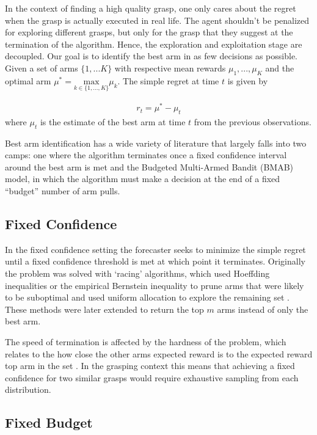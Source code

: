 \documentclass[journal,transmag]{IEEEtran}%
\begin{document}
In the context of finding a high quality grasp, one only cares about the regret when the grasp is actually executed in real life. The agent shouldn't be penalized for exploring different grasps, but only for the grasp that they suggest at the termination of the algorithm. Hence, the exploration and exploitation stage are decoupled. Our goal is to identify the best arm in as few decisions as possible.
Given a set of arms $\lbrace 1,...K \rbrace$ with respective mean rewards $\mu_1, ..., \mu_K$ and the optimal arm $\mu^* = \underset{k\in\lbrace 1, ..., K \rbrace}{\mbox{max}} \mu_k$.
The simple regret at time $t$ is given by

\vspace{-2ex}
\begin{align}\label{eq:simple_regret}
r_t = \mu^* - \mu_t
\end{align}
\noindent where $\mu_t$ is the estimate of the best arm at time $t$ from the previous observations. 

Best arm identification has a wide variety of literature that largely falls into two camps: one where the algorithm terminates once a fixed confidence interval around the best arm is met and the Budgeted Multi-Armed Bandit (BMAB) model, in which the algorithm must make a decision at the end of a fixed ``budget'' number of arm pulls.

\subsection{Fixed Confidence}
In the fixed confidence setting the forecaster seeks to minimize the simple regret until a fixed confidence threshold is met at which point it terminates. Originally the problem was solved with `racing' algorithms, which used Hoeffding inequalities or the empirical Bernstein inequality to prune arms that were likely to be suboptimal and used uniform allocation to explore the remaining set \cite{maron1993hoeffding} \cite{mnih2008empirical}. These methods were later extended to return the top $m$ arms instead of only the best arm\cite{gabillon2012best}. 

The speed of termination is affected by the hardness of the problem, which relates to the how close the other arms expected reward is to the expected reward top arm in the set \cite{audibert2010best}. In the grasping context this means that achieving a fixed confidence for two similar grasps would require exhaustive sampling from each distribution. 

\subsection{Fixed Budget}
\end{document}

